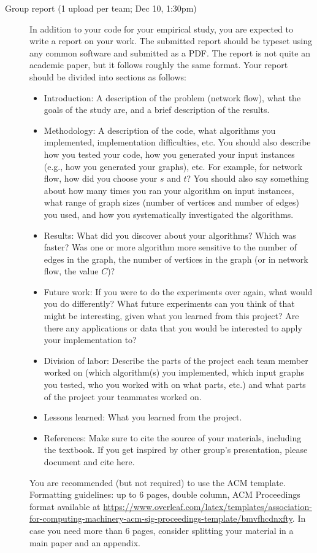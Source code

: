 \documentclass[11pt]{article}
\begin{document}
\begin{description}
\item [Group report (1 upload per team; Dec 10, 1:30pm)] 
In addition to your code for your empirical study, you are expected to write a report on your work.  The submitted report should be typeset using any common software and submitted as a PDF.  The report is not quite an academic paper, but it follows roughly the same format. Your report should be divided into sections as follows:
\begin{itemize}
\item Introduction: A description of the problem (network flow), what the goals of the study are, and a brief description of the results.
\item Methodology: A description of the code, what algorithms you implemented, implementation difficulties, etc. You should also describe how you tested your code, how you generated your input instances (e.g., how you generated your graphs), etc. For example, for network flow, how did you choose your $s$ and $t$?
You should also say something about how many times you ran your algorithm on input instances, what range of graph sizes (number of vertices and number of edges) you used, and how you systematically investigated the algorithms.
\item Results: What did you discover about your algorithms? Which was faster? Was one or more algorithm more sensitive to the number of edges in the graph, the number of vertices in the graph (or in network flow, the value $C$)?
\item Future work: If you were to do the experiments over again, what would you do differently? What future experiments can you think of that might be interesting, given what you learned from this project?  Are there any applications or data that you would be interested to apply your implementation to?
\item Division of labor: Describe the parts of the project each team member worked on (which algorithm(s) you implemented,  which input graphs you tested, who you worked with on what parts, etc.) and what parts of the project your teammates worked on.
\item Lessons learned: What you learned from the project.
\item References: Make sure to cite the source of your materials, including the textbook. If you get inspired by other group's presentation, please document and cite here.
\end{itemize}

You are recommended (but not required) to use the ACM template. Formatting guidelines: up to 6 pages, double column, ACM Proceedings format available at \url{https://www.overleaf.com/latex/templates/association-for-computing-machinery-acm-sig-proceedings-template/bmvfhcdnxfty}.  
In case you need more than 6 pages, consider splitting your material in a main paper and an appendix. 

\end{description}
\end{document}
